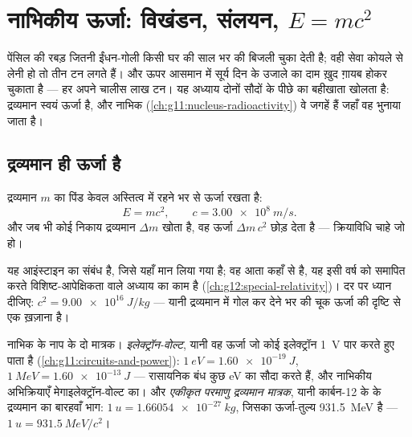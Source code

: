 \chapter{नाभिकीय ऊर्जा: विखंडन, संलयन, $E=mc^2$}\label{ch:g12:nuclear-energy}

पेंसिल की रबड़ जितनी ईंधन-गोली किसी घर की साल भर की बिजली चुका देती है; वही सेवा
कोयले से लेनी हो तो तीन टन लगते हैं। और ऊपर आसमान में सूर्य दिन के उजाले का दाम
ख़ुद ग़ायब होकर चुकाता है --- हर  अपने चालीस लाख टन। यह अध्याय दोनों सौदों
के पीछे का बहीखाता खोलता है: द्रव्यमान स्वयं ऊर्जा है, और नाभिक (\cref{ch:g11:nucleus-radioactivity})
वे जगहें हैं जहाँ वह भुनाया जाता है।

\section{द्रव्यमान ही ऊर्जा है}

\begin{theorem}[द्रव्यमान--ऊर्जा तुल्यता]\label{thm:g12:nuclear-energy:emc2}
द्रव्यमान $m$ का पिंड केवल अस्तित्व में रहने भर से ऊर्जा रखता है:
\[
E = m c^2, \qquad c = \qty{3.00e8}{m/s}.
\]
और जब भी कोई निकाय द्रव्यमान $\Delta m$ खोता है, वह ऊर्जा $\Delta m\, c^2$ छोड़ देता
है --- क्रियाविधि चाहे जो हो।
\end{theorem}
\admitted

\begin{remark}[आइंस्टाइन, 1905]\label{rem:g12:nuclear-energy:einstein}
यह आइंस्टाइन का संबंध है, जिसे यहाँ मान लिया गया है; वह आता कहाँ से है, यह इसी
वर्ष को समापित करते विशिष्ट-आपेक्षिकता वाले अध्याय का काम है (\cref{ch:g12:special-relativity})। दर पर
ध्यान दीजिए: $c^2 = \qty{9.00e16}{J/kg}$ --- यानी द्रव्यमान में गोल कर देने भर की चूक ऊर्जा
की दृष्टि से एक ख़ज़ाना है।
\end{remark}

\begin{definition}[इलेक्ट्रॉन-वोल्ट और परमाणु द्रव्यमान मात्रक]\label{def:g12:nuclear-energy:units}
नाभिक के नाप के दो मात्रक।
\emph{इलेक्ट्रॉन-वोल्ट}, यानी वह ऊर्जा जो कोई
इलेक्ट्रॉन \qty{1}{V} पार करते हुए पाता है (\cref{ch:g11:circuits-and-power}): $\qty{1}{eV} = \qty{1.60e-19}{J}$, $\qty{1}{MeV} = \qty{1.60e-13}{J}$ --- रासायनिक
बंध कुछ \unit{eV} का सौदा करते हैं, और नाभिकीय अभिक्रियाएँ
मेगाइलेक्ट्रॉन-वोल्ट का। और \emph{एकीकृत परमाणु द्रव्यमान
मात्रक}, यानी कार्बन-12 के 
के द्रव्यमान का बारहवाँ भाग: $\qty{1}{u} = \qty{1.66054e-27}{kg}$, जिसका ऊर्जा-तुल्य \qty{931.5}{MeV} है ---
$\qty{1}{u} = \qty{931.5}{MeV}/c^2$।
\end{definition}

